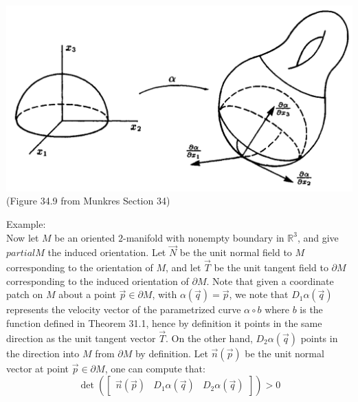 \documentclass[11pt,oneside]{book}
\theoremstyle{break}
\theoremstyle{break}
\newcommand{\R}{\mathbb{R}}
\newcommand{\bmat}[1]{\begin{bmatrix} #1 \end{bmatrix}}
\newcommand{\example}{\color{green}Example: \color{black}}
\begin{document}
\begin{center}
\includegraphics[scale=0.29]{3Orientation.png}\\
(Figure 34.9 from Munkres Section 34)
\end{center}
\newpage
\example \\
Now let $M$ be an oriented $2$-manifold with nonempty boundary in $\R^3$, and give $partial M$ the induced orientation. Let $\vec{N}$ be the unit normal field to $M$ corresponding to the orientation of $M$, and let $\vec{T}$ be the unit tangent field to $\partial M$ corresponding to the induced orientation of $\partial M$. Note that given a coordinate patch on $M$ about a point $\vec{p} \in \partial M$, with $\alpha(\vec{q}) = \vec{p}$, we note that $D_1\alpha(\vec{q})$ represents the velocity vector of the parametrized curve $\alpha\circ b$ where $b$ is the function defined in Theorem 31.1, hence by definition it points in the same direction as the unit tangent vector $\vec{T}$. On the other hand, $D_2\alpha(\vec{q})$ points in the direction into $M$ from $\partial M$ by definition. Let $\vec{n}(\vec{p})$ be the unit normal vector at point $\vec{p} \in \partial M$, one can compute that: 
$$\det\left(\bmat{\vec{n}(\vec{p})& D_1\alpha(\vec{q})& D_2\alpha(\vec{q})}\right) > 0$$ 
\end{document}
